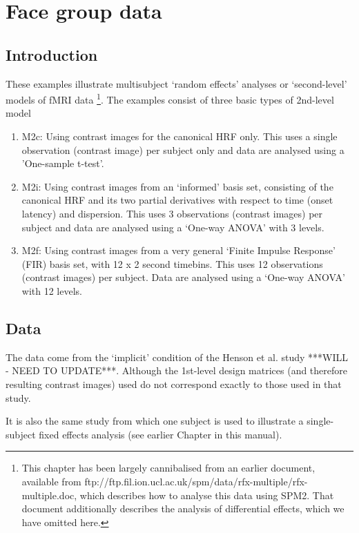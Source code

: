 
\chapter{Face group data}

\section{Introduction}

These examples illustrate multisubject `random effects' analyses or `second-level' models of fMRI data \cite{will_hbf2_rfx}\footnote{This chapter has been largely cannibalised from an earlier document, available from {\sf ftp://ftp.fil.ion.ucl.ac.uk/spm/data/rfx-multiple/rfx-multiple.doc}, which describes how to analyse this data using SPM2. 
That document additionally describes the analysis of differential effects, which we have omitted here.  }. 
The examples consist of three basic types of 2nd-level model
\begin{enumerate}
\item{M2c: Using contrast images for the canonical HRF only. This uses a single observation (contrast image) per subject only and data are 
analysed using a 'One-sample t-test'.}
\item{M2i: Using contrast images from an `informed' basis set, consisting of the canonical HRF and its two partial derivatives with respect to time (onset latency) and dispersion. This uses
3 observations (contrast images) per subject and data are 
analysed using a `One-way ANOVA' with 3 levels.}
\item{M2f: Using contrast images from a very general `Finite Impulse Response' (FIR) basis set, with 12 x 2 second timebins. This 
uses 12 observations (contrast images) per subject. Data are 
analysed using a `One-way ANOVA' with 12 levels.}
\end{enumerate}

\section{Data}

The data come from the `implicit' condition of the Henson 
et al. study \cite{rik_face_rep} ***WILL - NEED TO UPDATE***. Although the 1st-level design matrices (and therefore resulting contrast images) used do not correspond exactly to those used in that study.

It is also the same study from which one subject is used to illustrate a single-subject fixed effects analysis (see earlier Chapter in this manual).

